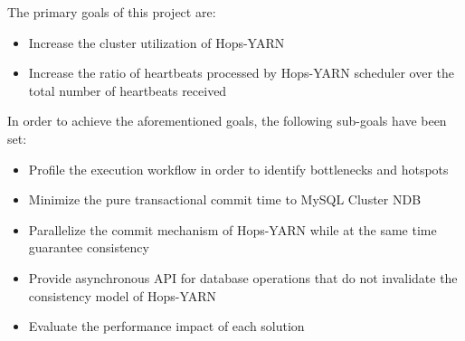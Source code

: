 The primary goals of this project are:
\begin{itemize}
\item Increase the cluster utilization of Hops-YARN

\item Increase the ratio of heartbeats processed by Hops-YARN
  scheduler over the total number of heartbeats received
\end{itemize}

In order to achieve the aforementioned goals, the following sub-goals
have been set:
\begin{itemize}
\item Profile the execution workflow in order to identify bottlenecks
  and hotspots

\item Minimize the pure transactional commit time to MySQL Cluster NDB

\item Parallelize the commit mechanism of Hops-YARN while at the same
  time guarantee consistency

\item Provide asynchronous API for database operations that do not invalidate the
  consistency model of Hops-YARN

\item Evaluate the performance impact of each solution
\end{itemize}
